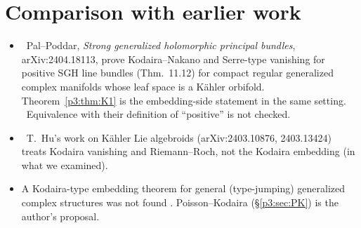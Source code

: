 \section{Comparison with earlier work}\label{p3:sec:compare}
\begin{itemize}
\item \tC\ Pal--Poddar, \emph{Strong generalized holomorphic principal bundles}, arXiv:2404.18113, prove Kodaira--Nakano and Serre-type vanishing for positive SGH line bundles (Thm.~11.12) for compact regular generalized complex manifolds whose leaf space is a K\"ahler orbifold. Theorem~\ref{p3:thm:K1} is the embedding-side statement in the same setting. \tQ\ Equivalence with their definition of ``positive'' is not checked.
\item \tC\ T.\ Hu's work on K\"ahler Lie algebroids (arXiv:2403.10876, 2403.13424) treats Kodaira vanishing and Riemann--Roch, not the Kodaira embedding (in what we examined).
\item A Kodaira-type embedding theorem for general (type-jumping) generalized complex structures was not found \tC. Poisson--Kodaira (\S\ref{p3:sec:PK}) is the author's proposal.
\end{itemize}

